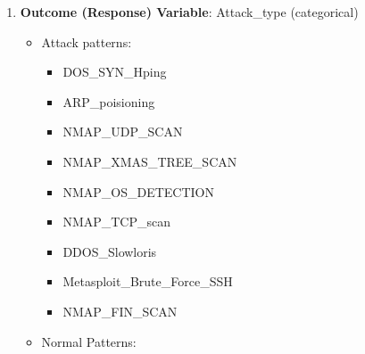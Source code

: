 \documentclass[
  8pt,
  letterpaper,
  DIV=11,
  numbers=noendperiod]{scrreprt}
\providecommand{\tightlist}{%
  \setlength{\itemsep}{0pt}\setlength{\parskip}{0pt}}
\begin{document}
\begin{enumerate}
  \begin{itemize}
  \tightlist
  \item
    .min --- minimum observed value within the flow.
  \item
    .max --- maximum observed value within the flow.
  \item
    .tot --- total accumulated value.
  \item
    .avg --- arithmetic mean across packets/events.
  \item
    .std --- standard deviation measuring variability.
  \item
    \_per\_sec --- rate-based metric normalized by time.
  \item
    \_flag\_count --- count of packets containing specific TCP control
    flags.
  \item
    \_bytes, \_pkts, \_payload --- volume-based measurements describing
    byte counts, packet counts, or payload sizes.
  \item
    \_iat --- inter-arrival time statistics between packets.
  \item
    \_window\_size --- TCP window characteristics reflecting
    transport-layer behavior.
  \end{itemize}

  This prefix--suffix structure enables consistent interpretation across
  the 83 features while allowing the same behavioral concept (e.g.,
  payload size or timing variability) to be analyzed across traffic
  directions and statistical summaries.
\item
  \textbf{Outcome (Response) Variable}: Attack\_type (categorical)

  \begin{itemize}
  \tightlist
  \item
    Attack patterns:

    \begin{itemize}
    \tightlist
    \item
      DOS\_SYN\_Hping
    \item
      ARP\_poisioning
    \item
      NMAP\_UDP\_SCAN
    \item
      NMAP\_XMAS\_TREE\_SCAN
    \item
      NMAP\_OS\_DETECTION
    \item
      NMAP\_TCP\_scan
    \item
      DDOS\_Slowloris
    \item
      Metasploit\_Brute\_Force\_SSH
    \item
      NMAP\_FIN\_SCAN
    \end{itemize}
  \item
    Normal Patterns:


\end{itemize}
\end{enumerate}
\end{document}
